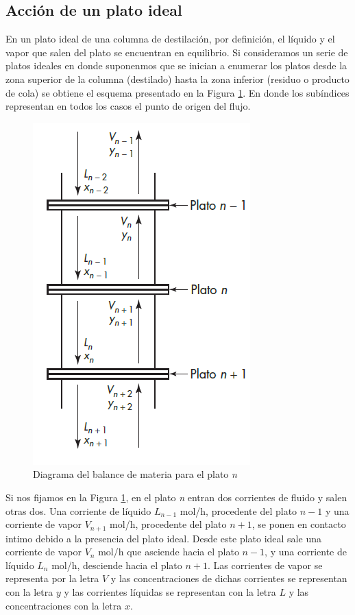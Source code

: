 \documentclass[11pt]{book}
\begin{document}
\subsection{Acción de un plato ideal}

En un plato ideal de una columna de destilación, por definición, el líquido y el vapor que salen del plato se encuentran en equilibrio. Si consideramos un serie de platos ideales en donde suponenmos que se inician a enumerar los platos desde la zona superior de la columna (destilado) hasta la zona inferior (residuo o producto de cola) se obtiene el esquema presentado en la Figura \ref{fig:PlatoIdeal}. En donde los subíndices representan en todos los casos el punto de origen del flujo.

\begin{figure}
    \centering
    \includegraphics[width=0.4\linewidth]{img/destilacion/PlatoIdeal.PNG}
    \caption{Diagrama del balance de materia para el plato \textit{n}}
    \label{fig:PlatoIdeal}
\end{figure}

Si nos fijamos en la Figura \ref{fig:PlatoIdeal}, en el plato \textit{n} entran dos corrientes de fluido y salen otras dos. Una corriente de líquido $L_{n-1}$ mol/h, procedente del plato $n-1$ y una corriente de vapor $V_{n+1}$ mol/h, procedente del plato $n+1$, se ponen en contacto intimo debido a la presencia del plato ideal. Desde este plato ideal sale una corriente de vapor $V_n$ mol/h que asciende hacia el plato $n-1$, y una corriente de líquido $L_n$ mol/h, desciende hacia el plato $n+1$. Las corrientes de vapor se representa por la letra $V$ y las concentraciones de dichas corrientes se representan con la letra $y$ y las corrientes líquidas se representan con la letra $L$ y las concentraciones con la letra $x$.
\end{document}
